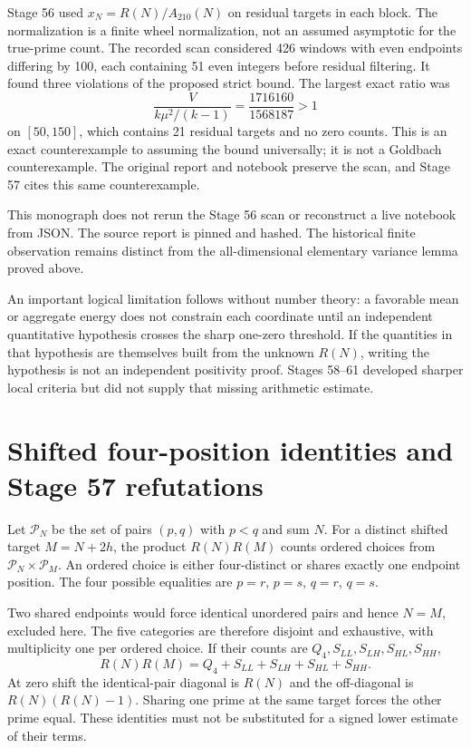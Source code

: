 \documentclass[11pt,a4paper]{article}
\begin{document}
Stage 56 used $x_N=R(N)/A_{210}(N)$ on residual targets in each block. The normalization is a finite wheel normalization, not an assumed asymptotic for the true-prime count. The recorded scan considered 426 windows with even endpoints differing by 100, each containing 51 even integers before residual filtering. It found three violations of the proposed strict bound. The largest exact ratio was
\[
 \frac{V}{k\mu^2/(k-1)}=\frac{1716160}{1568187}>1
\]
on $[50,150]$, which contains 21 residual targets and no zero counts. This is an exact counterexample to assuming the bound universally; it is not a Goldbach counterexample. The original report and notebook preserve the scan, and Stage 57 cites this same counterexample.

This monograph does not rerun the Stage 56 scan or reconstruct a live notebook from JSON. The source report is pinned and hashed. The historical finite observation remains distinct from the all-dimensional elementary variance lemma proved above.

An important logical limitation follows without number theory: a favorable mean or aggregate energy does not constrain each coordinate until an independent quantitative hypothesis crosses the sharp one-zero threshold. If the quantities in that hypothesis are themselves built from the unknown $R(N)$, writing the hypothesis is not an independent positivity proof. Stages 58--61 developed sharper local criteria but did not supply that missing arithmetic estimate.
\newpage
\section{Shifted four-position identities and Stage 57 refutations}
Let $\mathcal P_N$ be the set of pairs $(p,q)$ with $p<q$ and sum $N$. For a distinct shifted target $M=N+2h$, the product $R(N)R(M)$ counts ordered choices from $\mathcal P_N\times\mathcal P_M$. An ordered choice is either four-distinct or shares exactly one endpoint position. The four possible equalities are $p=r$, $p=s$, $q=r$, $q=s$.

Two shared endpoints would force identical unordered pairs and hence $N=M$, excluded here. The five categories are therefore disjoint and exhaustive, with multiplicity one per ordered choice. If their counts are $Q_4,S_{LL},S_{LH},S_{HL},S_{HH}$,
\[
 R(N)R(M)=Q_4+S_{LL}+S_{LH}+S_{HL}+S_{HH}.
\]
At zero shift the identical-pair diagonal is $R(N)$ and the off-diagonal is $R(N)(R(N)-1)$. Sharing one prime at the same target forces the other prime equal. These identities must not be substituted for a signed lower estimate of their terms.
\end{document}
